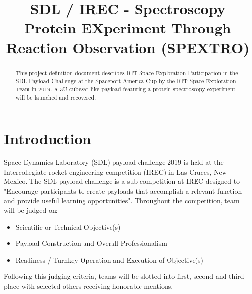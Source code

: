 \documentclass[conference]{IEEEtran} %
\title{SDL / IREC - Spectroscopy Protein EXperiment Through Reaction Observation (SPEXTRO)}
\author{
  \IEEEauthorblockN{%
    Dylan~Wagner\IEEEauthorrefmark{1},  %
    T.J.~Tarazevits\IEEEauthorrefmark{2},
    Keshav~Adhyay\IEEEauthorrefmark{3},
    and
    Matthew~Glazer\IEEEauthorrefmark{4}
  }
  \IEEEauthorblockA{%
    RIT Space Exploration, Rochester Institute of Technology \\ %
    Rochester, N.Y. \\
    Email:
    \IEEEauthorrefmark{1}drw6528@rit.edu,
    \IEEEauthorrefmark{2}tjt3085@rit.edu,
    \IEEEauthorrefmark{3}kar4669@rit.edu,
    \IEEEauthorrefmark{4}msg1254@rit.edu
  }

}
\begin{document}
\maketitle%

\begin{abstract}
This project definition document describes RIT Space Exploration Participation in the SDL Payload Challenge at the Spaceport America Cup by the RIT Space Exploration Team in 2019. A 3U cubesat-like payload featuring a protein spectroscopy experiment will be launched and recovered.

\end{abstract}



\section{Introduction}
\label{sec:introduction}

 Space Dynamics Laboratory (SDL) payload challenge 2019 is held at the Intercollegiate rocket engineering competition (IREC) in Las Cruces, New Mexico. The SDL payload challenge is a sub competition at IREC designed to "Encourage participants to create payloads that accomplish a relevant function and provide useful learning opportunities". Throughout the competition, team will be judged on: 
\begin{itemize}
	\item Scientific or Technical Objective(s)
	\item Payload Construction and Overall Professionalism 
	\item Readiness / Turnkey Operation and Execution of Objective(s) ~\cite{sdl}
\end{itemize} Following this judging criteria, teams will be slotted into first, second and third place with selected others receiving honorable mentions.
\end{document}
